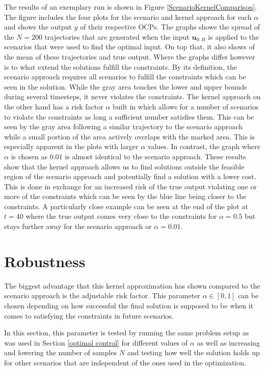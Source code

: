 The results of an exemplary run is shown in Figure \ref{ScenarioKernelComparison}. The figure includes the four plots for the scenario and kernel approach for each $\alpha$ and shows the output $y$ of their respective OCPs. The graphs shows the spread of the $N = 200$ trajectories that are generated when the input $\boldsymbol{u}_{0:H}$ is applied to the scenarios that were used to find the optimal input. On top that, it also shows of the mean of these trajectories and true output. Where the graphs differ however is to what extend the solutions fulfill the constraints. By its definition, the scenario approach requires all scenarios to fulfill the constraints which can be seen in the solution. While the gray area touches the lower and upper bounds during several timesteps, it never violates the constraints. The kernel approach on the other hand has a risk factor $\alpha$ built in which allows for a number of scenarios to violate the constraints as long a sufficient number satisfies them. This can be seen by the gray area following a similar trajectory to the scenario approach while a small portion of the area actively overlaps with the marked area. This is especially apparent in the plots with larger $\alpha$ values. In contrast, the graph where $\alpha$ is chosen as $0.01$ is almost identical to the scenario approach. These results show that the kernel approach allows us to find solutions outside the feasible region of the scenario approach and potentially find a solution with a lower cost. This is done in exchange for an increased risk of the true output violating one or more of the constraints which can be seen by the blue line being closer to the constraints. A particularly close example can be seen at the end of the plot at $t = 40$ where the true output comes very close to the constraints for $\alpha = 0.5$ but stays further away for the scenario approach or $\alpha = 0.01$.




\section{Robustness} \label{performance guarantees}

The biggest advantage that this kernel approximation has shown compared to the scenario approach is the adjustable risk factor. This parameter $\alpha \in [0, 1]$ can be chosen depending on how successful the final solution is supposed to be when it comes to satisfying the constraints in future scenarios. 

In this section, this parameter is tested by running the same problem setup as was used in Section \ref{optimal control} for different values of $\alpha$ as well as increasing and lowering the number of samples $N$ and testing how well the solution holds up for other scenarios that are independent of the ones used in the optimization.

